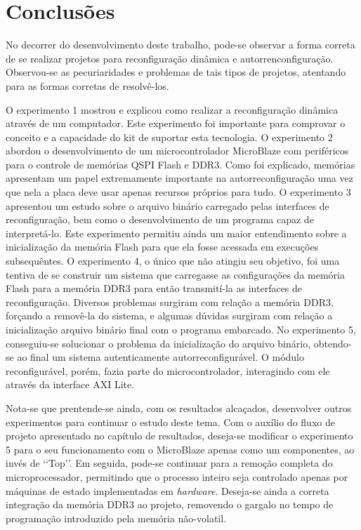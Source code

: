 ﻿%
                      

\chapter{Conclus\~{o}es}\label{CapConclusoes}
No decorrer do desenvolvimento deste trabalho, pode-se observar a forma correta de se realizar projetos para reconfiguração dinâmica e autorrenconfiguração.
Observou-se as pecuriaridades e problemas de tais tipos de projetos, atentando para as formas corretas de resolvê-los.

O experimento 1 mostrou e explicou como realizar a reconfiguração dinâmica através de um computador.
Este experimento foi importante para comprovar o conceito e a capacidade do kit de suportar esta tecnologia.
O experimento 2 abordou o desenvolvimento de um microcontrolador MicroBlaze com periféricos para o controle de memórias QSPI Flash e DDR3.
Como foi explicado, memórias apresentam um papel extremamente importante na autorreconfiguração uma vez que nela a placa deve usar apenas recursos próprios para tudo.
O experimento 3 apresentou um estudo sobre o arquivo binário carregado pelas interfaces de reconfiguração, bem como o desenvolvimento de um programa capaz de interpretá-lo.
Este experimento permitiu ainda um maior entendimento sobre a inicialização da memória Flash para que ela fosse acessada em execuções subsequêntes.
O experimento 4, o único que não atingiu seu objetivo, foi uma tentiva de se construir um sistema que carregasse as configurações da memória Flash para a memória DDR3 para então transmití-la as interfaces de reconfiguração.
Diversos problemas surgiram com relação a memória DDR3, forçando a removê-la do sistema, e algumas dúvidas surgiram com relação a inicialização arquivo binário final com o programa embarcado.
No experimento 5, conseguiu-se solucionar o problema da inicialização do arquivo binário, obtendo-se ao final um sistema autenticamente autorreconfigurável.
O módulo reconfigurável, porém, fazia parte do microcontrolador, interagindo com ele através da interface AXI Lite.

Nota-se que prentende-se ainda, com os resultados alcaçados, desenvolver outros experimentos para continuar o estudo deste tema.
Com o auxílio do fluxo de projeto apresentado no capítulo de resultados, deseja-se modificar o experimento 5 para o seu funcionamento com o MicroBlaze apenas como um componentes, ao invés de \lq\lq{}Top\rq\rq{}.
Em seguida, pode-se continuar para a remoção completa do microprocessador, permitindo que o processo inteiro seja controlado apenas por máquinas de estado implementadas em \textit{hardware}.
Deseja-se ainda a correta integração da memória DDR3 ao projeto, removendo o gargalo no tempo de programação introduzido pela memória não-volatil.